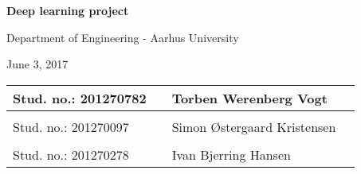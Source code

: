 
\centerline{\Huge\bfseries\color{ThemeColor} Deep learning project}

\vspace{5em}
\centerline{\large\bfseries\color{BlackColor}}
\vspace{0.5em}
\centerline{\large\color{BlackColor}Department of Engineering - Aarhus University}

\vspace{0.5em}
\centerline{\large\color{BlackColor} June 3, 2017}



\vspace{25em}

\begin{center}
   \begin{tabular}{ l p{3cm} l l }
    Stud. no.: 201270782 && Torben Werenberg Vogt & \\\hline
	& & \\
	Stud. no.: 201270097 && Simon Østergaard Kristensen & \\\hline
	& & \\
	Stud. no.: 201270278 && Ivan Bjerring Hansen & \\\hline
   \end{tabular}
\end{center}
\thispagestyle{empty} %
\restoregeometry

